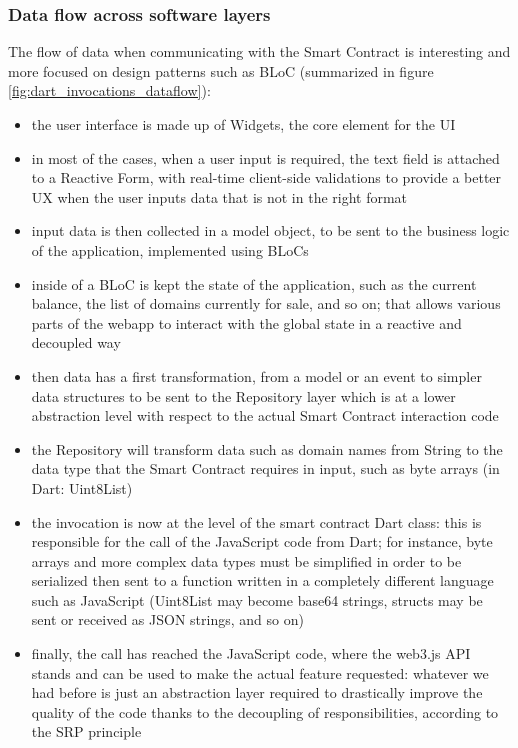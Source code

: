 \documentclass[main.tex]{subfiles}
\begin{document}
\subsubsection{Data flow across software layers}
The flow of data when communicating with the Smart Contract is interesting and more focused on design patterns such as BLoC (summarized in figure \ref{fig:dart_invocations_dataflow}):
\begin{itemize}
    \item the user interface is made up of Widgets, the core element for the UI
    \item in most of the cases, when a user input is required, the text field is attached to a Reactive Form, with real-time client-side validations to provide a better UX when the user inputs data that is not in the right format
    \item input data is then collected in a model object, to be sent to the business logic of the application, implemented using BLoCs
    \item inside of a BLoC is kept the state of the application, such as the current balance, the list of domains currently for sale, and so on; that allows various parts of the webapp to interact with the global state in a reactive and decoupled way
    \item then data has a first transformation, from a model or an event to simpler data structures to be sent to the Repository layer which is at a lower abstraction level with respect to the actual Smart Contract interaction code
    \item the Repository will transform data such as domain names from String to the data type that the Smart Contract requires in input, such as byte arrays (in Dart: Uint8List)
    \item the invocation is now at the level of the smart contract Dart class: this is responsible for the call of the JavaScript code from Dart; for instance, byte arrays and more complex data types must be simplified in order to be serialized then sent to a function written in a completely different language such as JavaScript (Uint8List may become base64 strings, structs may be sent or received as JSON strings, and so on)
    \item finally, the call has reached the JavaScript code, where the web3.js API stands and can be used to make the actual feature requested: whatever we had before is just an abstraction layer required to drastically improve the quality of the code thanks to the decoupling of responsibilities, according to the SRP principle
\end{itemize}
\end{document}
